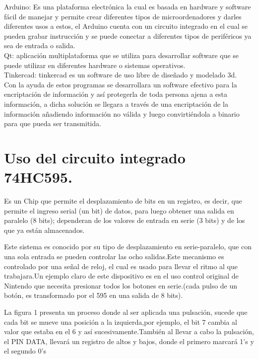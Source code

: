 \documentclass{article}
\begin{document}
Arduino: Es una plataforma electrónica la cual es basada en hardware y software fácil de manejar y permite crear diferentes tipos de microordenadores y darles diferentes usos a estos, el Arduino cuenta con un circuito integrado en el cual se pueden grabar instrucción y se puede conectar a diferentes tipos de periféricos ya sea de entrada o salida.\\

Qt: aplicación multiplataforma que se utiliza para desarrollar software que se puede utilizar en diferentes hardware o sistemas operativos.\\

Tinkercad: tinkercad es un software de uso libre de diseñado y modelado 3d.\\

Con la ayuda de estos programas se desarrollara un software efectivo para la encriptación de información y así protegerla de toda persona ajena a esta información, a dicha solución se llegara a través de una encriptación de la información añadiendo información no válida y luego convirtiéndola a binario para que pueda ser transmitida.



\newpage
\section{Uso del circuito integrado 74HC595.}
\label{74HC595}


Es un Chip que permite el desplazamiento de bits en un registro, es decir, que permite el ingreso serial (un bit) de datos, para luego obtener una salida en paralelo (8 bits); dependeran de los valores de entrada en serie (3 bits) y de los que ya están almacenados.

Este sistema es conocido por su tipo de desplazamiento en serie-paralelo, que con una sola entrada se pueden controlar las ocho salidas.Este mecanismo es controlado por una señal de reloj, el cual es usado para llevar el ritmo al que trabajara.Un ejemplo claro de este dispositivo es en el uso control original de Nintendo que necesita presionar todos los botones en serie.(cada pulso de un botón, es transformado por el 595 en una salida de 8 bits).

La figura 1 presenta un proceso donde al ser aplicada una pulsación, sucede que cada bit se mueve una posición a la izquierda,por ejemplo, el bit 7 cambia al valor que estaba en el 6 y así sucesivamente.También al llevar a cabo la pulsación, el PIN DATA, llevará un registro de altos y bajos, donde el primero marcará 1’s y el segundo 0’s
\end{document}
